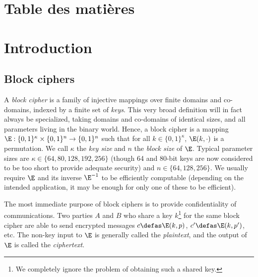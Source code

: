 

\cleardoublepage
\chapter*{Table des matières}
\parttoc


\chapter[Introduction]{Introduction}


\section{Block ciphers}

A \emph{block cipher} is a family of injective mappings over finite domains and co-domains, indexed by a finite set of \emph{keys}. This very broad definition will
in fact always be specialized, taking domains and co-domains of identical sizes, and all parameters living in the binary world. Hence, a block cipher
is a mapping $\E : \{0,1\}^\kappa \times \{0,1\}^n \rightarrow \{0,1\}^n$ such that for all $k \in \{0,1\}^\kappa$, $\E(k,\cdot)$ is a permutation.
We call $\kappa$ the \emph{key size} and $n$ the \emph{block size} of $\E$. Typical parameter sizes are $\kappa \in \{64, 80, 128, 192, 256\}$ (though
64 and 80-bit keys are now considered to be too short to provide adequate security) and $n \in \{64, 128, 256\}$.
We usually require $\E$ and its inverse $\E^{-1}$ to be efficiently computable (depending on the intended application, it may be enough for only
one of these to be efficient).

The most immediate purpose of block ciphers is to provide confidentiality of communications. Two parties $A$ and $B$ who share a key $k$\footnote{We
completely ignore the problem of obtaining such a shared key.} for the same
block cipher are able to send encrypted messages $c \defas \E(k,p)$, $c' \defas \E(k,p')$, etc. The non-key input to $\E$ is generally called
the \emph{plaintext}, and the output of $\E$ is called the \emph{ciphertext}.

